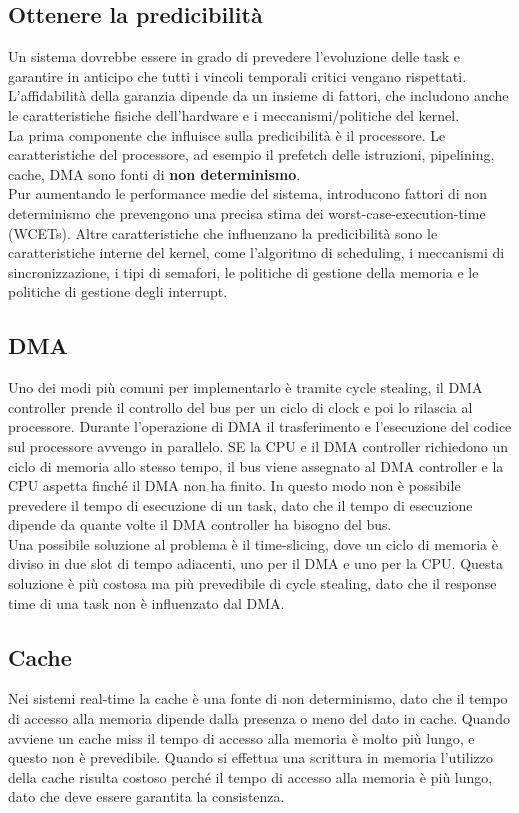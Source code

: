 \documentclass[12pt]{article}
\begin{document}
\subsection{Ottenere la predicibilità}
Un sistema dovrebbe essere in grado di prevedere l'evoluzione delle task e garantire in anticipo che tutti i vincoli temporali critici 
vengano rispettati.
L'affidabilità della garanzia dipende da un insieme di fattori, che includono anche le caratteristiche fisiche dell'hardware e 
i meccanismi/politiche del kernel.
\\
La prima componente che influisce sulla predicibilità è il processore. Le caratteristiche del processore, ad esempio il prefetch delle istruzioni, 
pipelining, cache, DMA sono fonti di \textbf{non determinismo}.
\\
Pur aumentando le performance medie del sistema, introducono fattori di non determinismo che prevengono una precisa stima dei worst-case-execution-time (WCETs).
Altre caratteristiche che influenzano la predicibilità sono le caratteristiche interne del kernel, come l'algoritmo di scheduling, i meccanismi di sincronizzazione, 
i tipi di semafori, le politiche di gestione della memoria e le politiche di gestione degli interrupt.
\subsection{DMA}
Uno dei modi più comuni per implementarlo è tramite cycle stealing, il DMA controller prende il controllo del bus per un ciclo di clock 
e poi lo rilascia al processore.
Durante l'operazione di DMA il trasferimento e l'esecuzione del codice sul processore avvengo in parallelo.
SE la CPU e il DMA controller richiedono un ciclo di memoria allo stesso tempo, il bus viene assegnato al DMA controller e la CPU
aspetta finché il DMA non ha finito.
In questo modo non è possibile prevedere il tempo di esecuzione di un task, dato che il tempo di esecuzione dipende da quante volte il DMA controller ha bisogno del bus.
\\
Una possibile soluzione al problema è il time-slicing, dove un ciclo di memoria è diviso in due slot di tempo adiacenti, uno per il DMA e uno per la CPU.
Questa soluzione è più costosa ma più prevedibile di cycle stealing, dato che il response time di una task non è influenzato dal DMA.
\subsection{Cache}
Nei sistemi real-time la cache è una fonte di non determinismo, dato che il tempo di accesso alla memoria dipende dalla presenza o meno del dato in cache.
Quando avviene un cache miss il tempo di accesso alla memoria è molto più lungo, e questo non è prevedibile.
Quando si effettua una scrittura in memoria l'utilizzo della cache risulta costoso perché il tempo di accesso alla memoria è più lungo, dato che deve essere garantita la consistenza.
\end{document}
